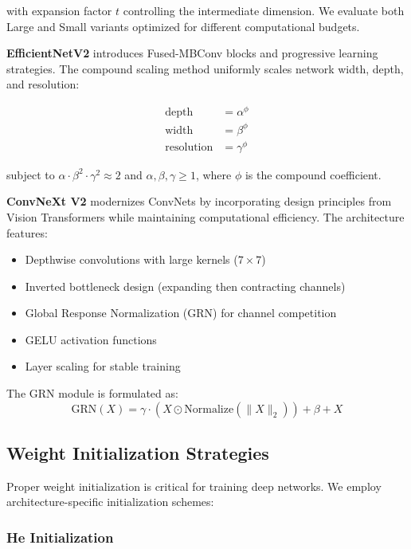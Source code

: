 with expansion factor $t$ controlling the intermediate dimension. We evaluate both Large and Small variants optimized for different computational budgets.

\textbf{EfficientNetV2} introduces Fused-MBConv blocks and progressive learning strategies. The compound scaling method uniformly scales network width, depth, and resolution:

\begin{align}
\text{depth} &= \alpha^\phi \\
\text{width} &= \beta^\phi \\
\text{resolution} &= \gamma^\phi
\end{align}

subject to $\alpha \cdot \beta^2 \cdot \gamma^2 \approx 2$ and $\alpha, \beta, \gamma \geq 1$, where $\phi$ is the compound coefficient.

\textbf{ConvNeXt V2} modernizes ConvNets by incorporating design principles from Vision Transformers while maintaining computational efficiency. The architecture features:
\begin{itemize}
    \item Depthwise convolutions with large kernels ($7 \times 7$)
    \item Inverted bottleneck design (expanding then contracting channels)
    \item Global Response Normalization (GRN) for channel competition
    \item GELU activation functions
    \item Layer scaling for stable training
\end{itemize}

The GRN module is formulated as:
\begin{equation}
\text{GRN}(X) = \gamma \cdot (X \odot \text{Normalize}(\|X\|_2)) + \beta + X
\end{equation}

\subsection{Weight Initialization Strategies}

Proper weight initialization is critical for training deep networks. We employ architecture-specific initialization schemes:

\subsubsection{He Initialization}

